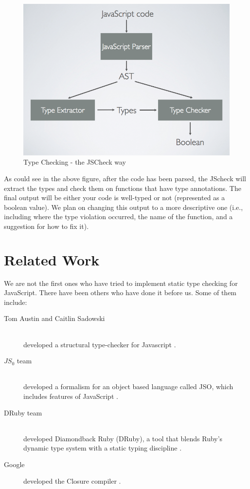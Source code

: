\documentclass{article}
\begin{document}
\begin{figure}[here]
  \begin{center}
    \includegraphics[scale=0.5]{blockdiagram.png}
  \end{center}
  \caption{Type Checking - the JSCheck way}
  \label{fig:jscheckway}
\end{figure}
\pagebreak



As could see in the above figure, after the code has been parsed, the JScheck will 
extract the types and check them on functions that have type annotations. The final 
output will be either your code is well-typed or not (represented as a boolean value). 
We plan on changing this output to a more descriptive one (i.e., including where the
type violation occurred, the name of the function, and a suggestion for how to fix it). 


\section{Related Work}
We are not the first ones who have tried to implement static type checking for JavaScript.
There have been others who have done it before us. Some of them include:

\begin{description}
  \item[Tom Austin and Caitlin Sadowski] \hfill \\ 
  developed a structural type-checker for Javascript \cite{fwjsStruct}.
  \item[$JS_0$ team] \hfill \\ 
  developed a formalism for an object based language called JSO, which includes features of JavaScript 
  \cite{typeinferenceforjavascriptEcoop,typecheckingforjavascript}. 
  \item[DRuby team] \hfill \\ 
  developed Diamondback Ruby (DRuby), a tool that blends Ruby's dynamic type 
  system with a static typing discipline \cite{typecheckingruby}.
  \item[Google] developed the Closure compiler \cite{closureCompiler}.  
\end{description}
\end{document}
